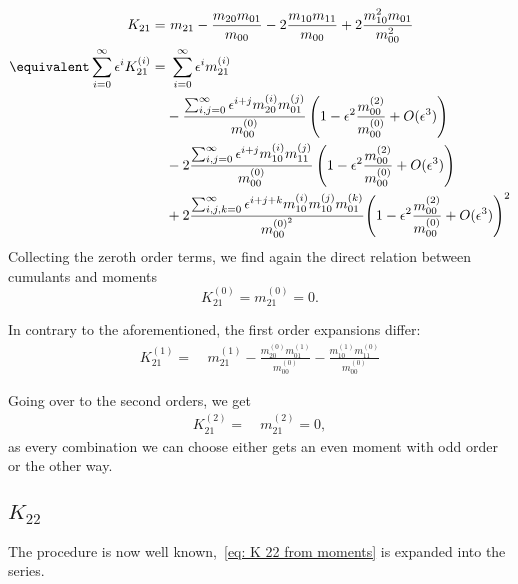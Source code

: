 \begin{equation}
  \begin{aligned}
    K_{21} = &\ m_{21} - \frac{m_{20}m_{01}}{m_{00}}
         - 2\frac{m_{10}m_{11}}{m_{00}} + 2\frac{m_{10}^2 m_{01}}{m_{00}^2}
    \\
    \equivalent
    \sum_{i=0}^\infty \epsilon^i K_{21}^{(i)}
     = &\ \sum_{i=0}^\infty \epsilon^i m_{21}^{(i)}
    \\ &
    - \frac{\sum_{i,j=0}^\infty \epsilon^{i+j} m_{20}^{(i)} m_{01}^{(j)}}{m_{00}^{(0)}}
      \left(1 - \epsilon^2 \frac{m_{00}^{(2)}}{m_{00}^{(0)}}  + O(\epsilon^3)\right)
    \\ &
     - 2\frac{\sum_{i,j=0}^\infty \epsilon^{i+j} m_{10}^{(i)} m_{11}^{(j)}}{m_{00}^{(0)}}
      \left(1 - \epsilon^2 \frac{m_{00}^{(2)}}{m_{00}^{(0)}}  + O(\epsilon^3)\right)
     \\ &
     +
        2 \frac{\sum_{i,j,k=0}^\infty \epsilon^{i+j+k} m_{10}^{(i)} m_{10}^{(j)} m_{01}^{(k)}}{m_{00}^{{(0)}^2}}
        {
          \left(1 - \epsilon^2 \frac{m_{00}^{(2)}}{m_{00}^{(0)}}  + O(\epsilon^3)\right)
        }^2
   \end{aligned}
\end{equation}
Collecting the zeroth order terms, we find again the direct relation between cumulants and moments
\begin{equation}
  K_{21}^{(0)} = m_{21}^{(0)} = 0.
\end{equation}

In contrary to the aforementioned, the first order expansions differ:
\begin{equation}
  \begin{aligned}
    K_{21}^{(1)} = &\ m_{21}^{(1)}
    - \frac{m_{20}^{(0)} m_{01}^{(1)}}{m_{00}^{(0)}}
    - \frac{m_{10}^{(1)} m_{11}^{(0)}}{m_{00}^{(0)}}
  \end{aligned}
\end{equation}

Going over to the second orders, we get
\begin{equation}
  \begin{aligned}
    K_{21}^{(2)} = &\ m_{21}^{(2)} = 0,
  \end{aligned}
\end{equation}
as every combination we can choose either gets an even moment with odd order or the other way.

\subsection{\texorpdfstring{$K_{22}$}{K 22}}
\label{sub: K 22}
The procedure is now well known,~\eqref{eq: K 22 from moments} is expanded into the series.

